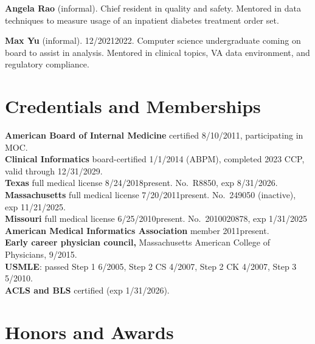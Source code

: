 \documentclass[10pt]{article}
\begin{document}
\textbf{Angela Rao} (informal). Chief resident in quality and safety.
Mentored in data techniques to measure usage of an inpatient diabetes
treatment order set.

\textbf{Max Yu} (informal). 12/2021\ndash{}2022. Computer science
undergraduate coming on board to assist in analysis. Mentored in
clinical topics, VA data environment, and regulatory compliance.




\section*{Credentials and Memberships}
\textbf{American Board of Internal Medicine} certified 8/10/2011,
participating in MOC.\\
\textbf{Clinical Informatics} board-certified 1/1/2014 (ABPM),
completed 2023 CCP, valid through 12/31/2029.\\
\textbf{Texas} full medical license 8/24/2018\ndash{}present. No.\ R8850,
exp 8/31/2026.\\
\textbf{Massachusetts} full medical license 7/20/2011\ndash{}present.
No.\ 249050 (inactive), exp 11/21/2025.\\
\textbf{Missouri} full medical license 6/25/2010\ndash{}present.
No.\ 2010020878, exp 1/31/2025\\
\textbf{American Medical Informatics Association} member
2011\ndash{}present.\\
\textbf{Early career physician council,} Massachusetts American
College of Physicians, 9/\ndash{}2015.\\
\textbf{USMLE}: passed Step 1 6/2005, Step 2 CS 4/2007, Step 2 CK
4/2007, Step 3 5/2010.\\
\textbf{ACLS and BLS} certified (exp 1/31/2026).




\section*{Honors and Awards}

\end{document}
